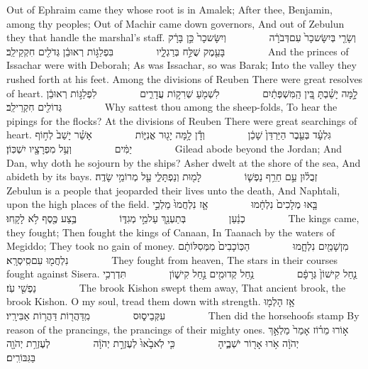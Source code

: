 {Out of Ephraim came they whose root is in Amalek; After thee, Benjamin, among thy peoples; Out of Machir came down governors, And out of Zebulun they that handle the marshal’s staff.}
{וְשָׂרַ֤י בְּיִשָּׂשכָר֙ עִם\maqqaf דְּבֹרָ֔ה         וְיִשָּׂשכָר֙ כֵּ֣ן בָּרָ֔ק בָּעֵ֖מֶק שֻׁלַּ֣ח בְּרַגְלָ֑יו         בִּפְלַגּ֣וֹת רְאוּבֵ֔ן גְּדֹלִ֖ים חִקְקֵי\maqqaf לֵֽב׃        }
{And the princes of Issachar were with Deborah; As was Issachar, so was Barak; Into the valley they rushed forth at his feet. Among the divisions of Reuben There were great resolves of heart.}
{לָ֣מָּה יָשַׁ֗בְתָּ בֵּ֚ין הַֽמִּשְׁפְּתַ֔יִם         לִשְׁמֹ֖עַ שְׁרִק֣וֹת עֲדָרִ֑ים         לִפְלַגּ֣וֹת רְאוּבֵ֔ן גְּדוֹלִ֖ים חִקְרֵי\maqqaf לֵֽב׃        }
{Why sattest thou among the sheep-folds, To hear the pipings for the flocks? At the divisions of Reuben There were great searchings of heart.}
{גִּלְעָ֗ד בְּעֵ֤בֶר הַיַּרְדֵּן֙ שָׁכֵ֔ן         וְדָ֕ן לָ֥מָּה יָג֖וּר אֳנִיּ֑וֹת         אָשֵׁ֗ר יָשַׁב֙ לְח֣וֹף יַמִּ֔ים         וְעַ֥ל מִפְרָצָ֖יו יִשְׁכּֽוֹן׃        }
{Gilead abode beyond the Jordan; And Dan, why doth he sojourn by the ships? Asher dwelt at the shore of the sea, And abideth by its bays.}
{זְבֻל֗וּן עַ֣ם חֵרֵ֥ף נַפְשׁ֛וֹ         לָמ֖וּת וְנַפְתָּלִ֑י עַ֖ל מְרוֹמֵ֥י שָׂדֶֽה׃        }
{Zebulun is a people that jeoparded their lives unto the death, And Naphtali, upon the high places of the field.}
{בָּ֤אוּ מְלָכִים֙ נִלְחָ֔מוּ         אָ֤ז נִלְחֲמוּ֙ מַלְכֵ֣י כְנַ֔עַן         בְּתַעְנַ֖ךְ עַל\maqqaf מֵ֣י מְגִדּ֑וֹ         בֶּ֥צַע כֶּ֖סֶף לֹ֥א לָקָֽחוּ׃        }
{The kings came, they fought; Then fought the kings of Canaan, In Taanach by the waters of Megiddo; They took no gain of money.}
{מִן\maqqaf שָׁמַ֖יִם נִלְחָ֑מוּ         הַכּֽוֹכָבִים֙ מִמְּסִלּוֹתָ֔ם נִלְחֲמ֖וּ עִם\maqqaf סִֽיסְרָֽא׃        }
{They fought from heaven, The stars in their courses fought against Sisera.}
{נַ֤חַל קִישׁוֹן֙ גְּרָפָ֔ם         נַ֥חַל קְדוּמִ֖ים נַ֣חַל קִישׁ֑וֹן         תִּדְרְכִ֥י נַפְשִׁ֖י עֹֽז׃        }
{The brook Kishon swept them away, That ancient brook, the brook Kishon. O my soul, tread them down with strength.}
{אָ֥ז הָלְמ֖וּ עִקְּבֵי\maqqaf ס֑וּס         מִֽדַּהֲר֖וֹת דַּהֲר֥וֹת אַבִּירָֽיו׃        }
{Then did the horsehoofs stamp By reason of the prancings, the prancings of their mighty ones.}
{א֣וֹרוּ מֵר֗וֹז אָמַר֙ מַלְאַ֣ךְ יְהֹוָ֔ה אֹ֥רוּ אָר֖וֹר יֹשְׁבֶ֑יהָ         כִּ֤י לֹֽא\maqqaf בָ֙אוּ֙ לְעֶזְרַ֣ת יְהֹוָ֔ה         לְעֶזְרַ֥ת יְהֹוָ֖ה בַּגִּבּוֹרִֽים׃        }
